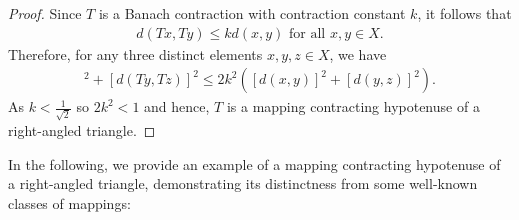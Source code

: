 \documentclass[11pt,reqno,a4paper]{amsart}
\theoremstyle{plain}
\theoremstyle{definition}
\theoremstyle{remark}
\numberwithin{equation}{section}
\begin{document}
\begin{proof}
Since $T$ is a Banach contraction with contraction constant $k$, it follows that
\begin{align*}
    d(Tx,Ty) \leq k d(x,y) \text{ for all } x, y \in X.
\end{align*}
Therefore, for any three distinct elements $x, y, z \in X$, we have
\begin{align*}
    [d(Tx,Ty)]^2 +[d(Ty,Tz)]^2 \le 2{k}^2 ([d(x,y)]^2+ [d(y,z)]^2).
\end{align*}
As $k < \frac{1}{\sqrt{2}}$ so $2{k}^2 < 1$ and hence, $T$ is a mapping contracting hypotenuse of a right-angled triangle.
\end{proof}
In the following, we provide an example of a mapping contracting hypotenuse of a right-angled triangle, demonstrating its distinctness from some well-known classes of mappings:
\end{document}
